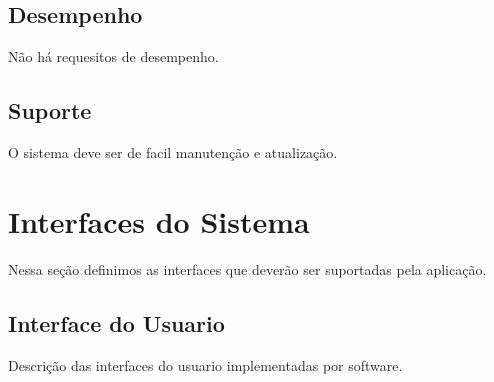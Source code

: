 \documentclass[11pt, a4paper]{article}
\begin{document}
		
		\subsection{Desempenho}
			Não há requesitos de desempenho. 
		
		\subsection{Suporte}
			O sistema deve ser de facil manutenção e atualização.
		
	\section{Interfaces do Sistema}
		Nessa seção definimos as interfaces que deverão ser suportadas pela 
		aplicação.
		
		\subsection{Interface do Usuario}
			Descrição das interfaces do usuario implementadas por software.
			
\end{document}
